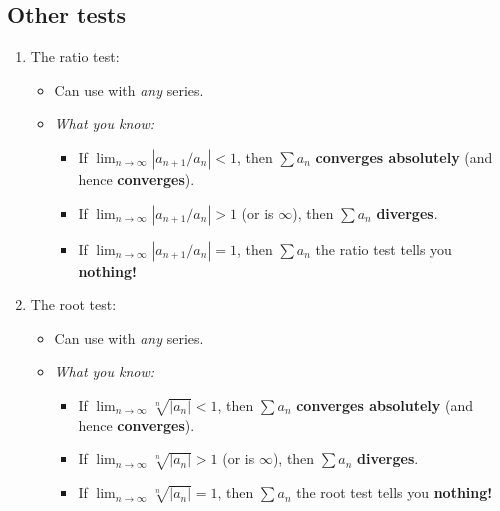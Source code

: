 \documentclass[12pt]{article}
\newcommand{\shortlim}{\lim_{n\to\infty}}
\begin{document}
	\subsection*{Other tests}
	\begin{enumerate}
		\item The ratio test:
		\begin{itemize}
			\item Can use with \textit{any} series.
			\item \textit{What you know:} 
			\begin{itemize}
				\item If $\shortlim|a_{n+1}/a_n|<1$, then $\sum a_n$ \textbf{converges absolutely} (and hence \textbf{converges}).
				\item If $\shortlim|a_{n+1}/a_n|>1$ (or is $\infty$), then $\sum a_n$ \textbf{diverges}.
				\item If $\shortlim|a_{n+1}/a_n|=1$, then $\sum a_n$ the ratio test tells you \textbf{nothing!}
			\end{itemize}
		\end{itemize} 
	
		\item The root test:
		\begin{itemize}
			\item Can use with \textit{any} series.
			\item \textit{What you know:} 
			\begin{itemize}
				\item If $\shortlim\sqrt[n]{|a_n|}<1$, then $\sum a_n$ \textbf{converges absolutely} (and hence \textbf{converges}).
				\item If $\shortlim\sqrt[n]{|a_n|}>1$ (or is $\infty$), then $\sum a_n$ \textbf{diverges}.
				\item If $\shortlim\sqrt[n]{|a_n|}=1$, then $\sum a_n$ the root test tells you \textbf{nothing!}
			\end{itemize}
		\end{itemize} 
	\end{enumerate}
\end{document}
